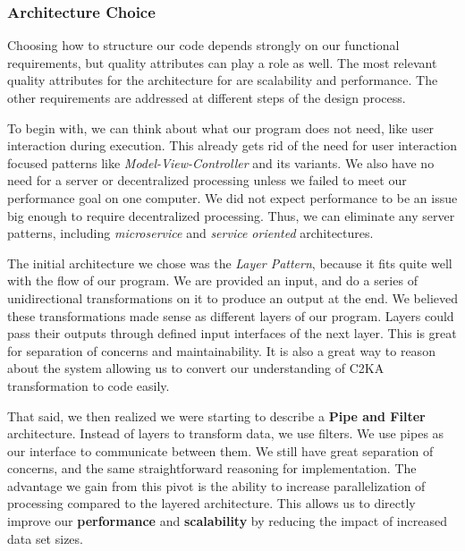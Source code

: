 \documentclass[11pt]{article}
\begin{document}
    \newpage
    \subsubsection{Architecture Choice}
    Choosing how to structure our code depends strongly on our functional requirements,
    but quality attributes can play a role as well.
    The most relevant quality attributes for the architecture for are scalability and performance.
    The other requirements are addressed at different steps of the design process.

    To begin with, we can think about what our program does not need, like user interaction during execution.
    This already gets rid of the need for user interaction focused patterns like \textit{Model-View-Controller} and its variants.
    We also have no need for a server or decentralized processing unless we failed to meet our performance goal on one computer.
    We did not expect performance to be an issue big enough to require decentralized processing.
    Thus, we can eliminate any server patterns, including \textit{microservice} and \textit{service oriented} architectures.

    The initial architecture we chose was the \textit{Layer Pattern}, because it fits quite well with the flow of our program.
    We are provided an input, and do a series of unidirectional transformations on it to produce an output at the end.
    We believed these transformations made sense as different layers of our program.
    Layers could pass their outputs through defined input interfaces of the next layer.
    This is great for separation of concerns and maintainability.
    It is also a great way to reason about the system allowing us to convert our understanding of C2KA transformation to code easily.

    That said, we then realized we were starting to describe a \textbf{Pipe and Filter} architecture.
    Instead of layers to transform data, we use filters.
    We use pipes as our interface to communicate between them.
    We still have great separation of concerns, and the same straightforward reasoning for implementation.
    The advantage we gain from this pivot is the ability to increase parallelization of processing compared to the layered architecture.
    This allows us to directly improve our \textbf{performance} and \textbf{scalability} by reducing the impact of increased data set sizes.
\end{document}
